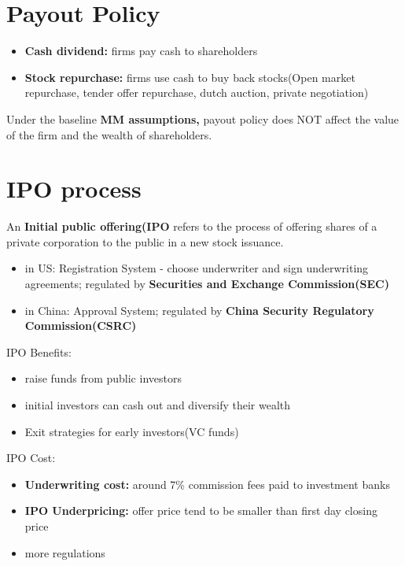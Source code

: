 \documentclass{article}
\theoremstyle{definition}
\theoremstyle{thrm}
\theoremstyle{lma}
\theoremstyle{ppst}
\theoremstyle{crlr}
\begin{document}
\section{Payout Policy}
\begin{itemize}
	\item \textbf{Cash dividend:} firms pay cash to shareholders
	\item \textbf{Stock repurchase:} firms use cash to buy back stocks(Open market repurchase, tender offer repurchase, dutch auction, private negotiation)
\end{itemize}
Under the baseline \textbf{MM assumptions,} payout policy does NOT affect the value of the firm and the wealth of shareholders. 

\section{IPO process}
An \textbf{Initial public offering(IPO} refers to the process of offering shares of a private corporation to the public in a new stock issuance. 
\begin{itemize}
	\item in US: Registration System - choose underwriter and sign underwriting agreements; regulated by \textbf{Securities and Exchange Commission(SEC)}
	\item in China: Approval System; regulated by \textbf{China Security Regulatory Commission(CSRC)}
\end{itemize}
IPO Benefits:
\begin{itemize}
	\item raise funds from public investors
	\item initial investors can cash out and diversify their wealth
	\item Exit strategies for early investors(VC funds)
\end{itemize}
IPO Cost:
\begin{itemize}
	\item \textbf{Underwriting cost:} around 7\% commission fees paid to investment banks
	\item \textbf{IPO Underpricing:} offer price tend to be smaller than first day closing price
	\item more regulations
\end{itemize}
\end{document}
